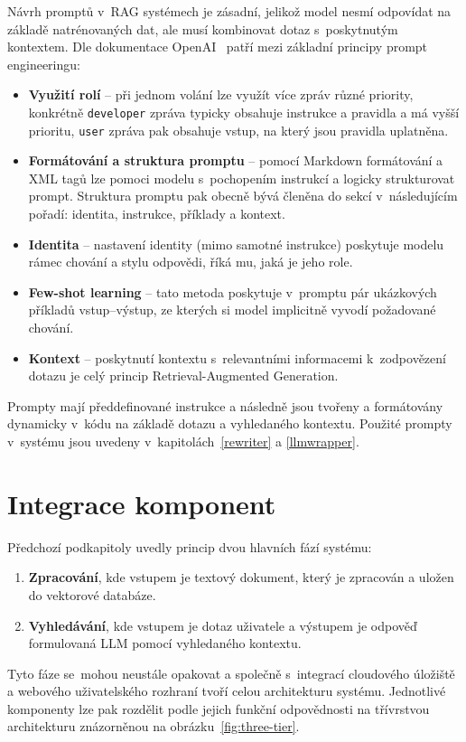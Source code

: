 Návrh promptů v~RAG systémech je zásadní, jelikož model nesmí odpovídat na základě natrénovaných dat, ale musí kombinovat dotaz s~poskytnutým kontextem. Dle dokumentace OpenAI~\cite{openaidocs} patří mezi základní principy prompt engineeringu:
\begin{itemize}
    \item \textbf{Využití rolí} – při jednom volání lze využít více zpráv různé priority, konkrétně \texttt{developer} zpráva typicky obsahuje instrukce a pravidla a má vyšší prioritu, \texttt{user} zpráva pak obsahuje vstup, na který jsou pravidla uplatněna.
    
    \item \textbf{Formátování a struktura promptu} – pomocí Markdown formátování a XML tagů lze pomoci modelu s~pochopením instrukcí a logicky strukturovat prompt. Struktura promptu pak obecně bývá členěna do sekcí v~následujícím pořadí: identita, instrukce, příklady a kontext.
    
    \item \textbf{Identita} – nastavení identity (mimo samotné instrukce) poskytuje modelu rámec chování a stylu odpovědi, říká mu, jaká je jeho role.

    \item \textbf{Few-shot learning} – tato metoda poskytuje v~promptu pár ukázkových příkladů vstup–výstup, ze kterých si model implicitně vyvodí požadované chování. 

    \item \textbf{Kontext} – poskytnutí kontextu s~relevantními informacemi k~zodpovězení dotazu je celý princip Retrieval-Augmented Generation.
\end{itemize}

Prompty mají předdefinované instrukce a následně jsou tvořeny a formátovány dynamicky v~kódu na základě dotazu a vyhledaného kontextu. Použité prompty v~systému jsou uvedeny v~kapitolách~\ref{rewriter} a \ref{llmwrapper}.

\section{Integrace komponent}
Předchozí podkapitoly uvedly princip dvou hlavních fází systému:
\begin{enumerate}
    \item \textbf{Zpracování}, kde vstupem je textový dokument, který je zpracován a uložen do vektorové databáze.
    \item \textbf{Vyhledávání}, kde vstupem je dotaz uživatele a výstupem je odpověď formulovaná LLM pomocí vyhledaného kontextu.
\end{enumerate}
Tyto fáze se~mohou neustále opakovat a společně s~integrací cloudového úložiště a webového uživatelského rozhraní tvoří celou architekturu systému. Jednotlivé komponenty lze pak rozdělit podle jejich funkční odpovědnosti na třívrstvou architekturu znázorněnou na obrázku~\ref{fig:three-tier}.

